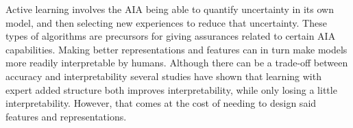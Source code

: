     Active learning involves the AIA being able to quantify uncertainty in its own model, and then selecting new experiences to reduce that uncertainty. These types of algorithms are precursors for giving assurances related to certain AIA capabilities. Making better representations and features can in turn make models more readily interpretable by humans. Although there can be a trade-off between accuracy and interpretability several studies have shown that learning with expert added structure both improves interpretability, while only losing a little interpretability. However, that comes at the cost of needing to design said features and representations.
